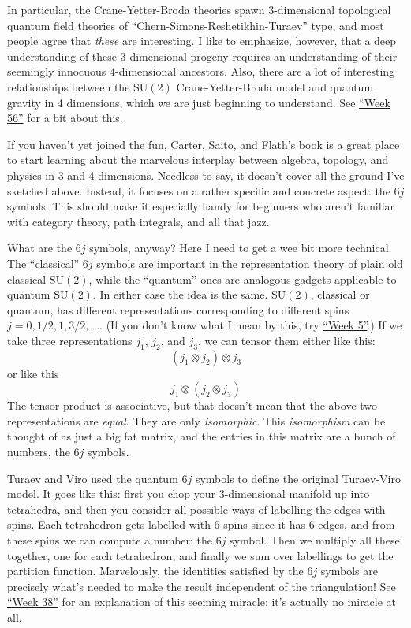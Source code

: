 \documentclass{article}
\begin{document}
In particular, the Crane-Yetter-Broda theories spawn \(3\)-dimensional
topological quantum field theories of
``Chern-Simons-Reshetikhin-Turaev'' type, and most people agree that
\emph{these} are interesting. I like to emphasize, however, that a deep
understanding of these \(3\)-dimensional progeny requires an
understanding of their seemingly innocuous \(4\)-dimensional ancestors.
Also, there are a lot of interesting relationships between the
\(\mathrm{SU}(2)\) Crane-Yetter-Broda model and quantum gravity in 4
dimensions, which we are just beginning to understand. See
\protect\hyperlink{week56}{``Week 56''} for a bit about this.

If you haven't yet joined the fun, Carter, Saito, and Flath's book is a
great place to start learning about the marvelous interplay between
algebra, topology, and physics in 3 and 4 dimensions. Needless to say,
it doesn't cover all the ground I've sketched above. Instead, it focuses
on a rather specific and concrete aspect: the \(6j\) symbols. This
should make it especially handy for beginners who aren't familiar with
category theory, path integrals, and all that jazz.

What are the \(6j\) symbols, anyway? Here I need to get a wee bit more
technical. The ``classical'' \(6j\) symbols are important in the
representation theory of plain old classical \(\mathrm{SU}(2)\), while
the ``quantum'' ones are analogous gadgets applicable to quantum
\(\mathrm{SU}(2)\). In either case the idea is the same.
\(\mathrm{SU}(2)\), classical or quantum, has different representations
corresponding to different spins \(j = 0, 1/2, 1, 3/2,\ldots\). (If you
don't know what I mean by this, try \protect\hyperlink{week5}{``Week
5''}.) If we take three representations \(j_1\), \(j_2\), and \(j_3\),
we can tensor them either like this: \[(j_1\otimes j_2)\otimes j_3\] or
like this \[j_1\otimes (j_2\otimes j_3)\] The tensor product is
associative, but that doesn't mean that the above two representations
are \emph{equal}. They are only \emph{isomorphic}. This
\emph{isomorphism} can be thought of as just a big fat matrix, and the
entries in this matrix are a bunch of numbers, the \(6j\) symbols.

Turaev and Viro used the quantum \(6j\) symbols to define the original
Turaev-Viro model. It goes like this: first you chop your
\(3\)-dimensional manifold up into tetrahedra, and then you consider all
possible ways of labelling the edges with spins. Each tetrahedron gets
labelled with 6 spins since it has 6 edges, and from these spins we can
compute a number: the \(6j\) symbol. Then we multiply all these
together, one for each tetrahedron, and finally we sum over labellings
to get the partition function. Marvelously, the identities satisfied by
the \(6j\) symbols are precisely what's needed to make the result
independent of the triangulation! See \protect\hyperlink{week38}{``Week
38''} for an explanation of this seeming miracle: it's actually no
miracle at all.
\end{document}
